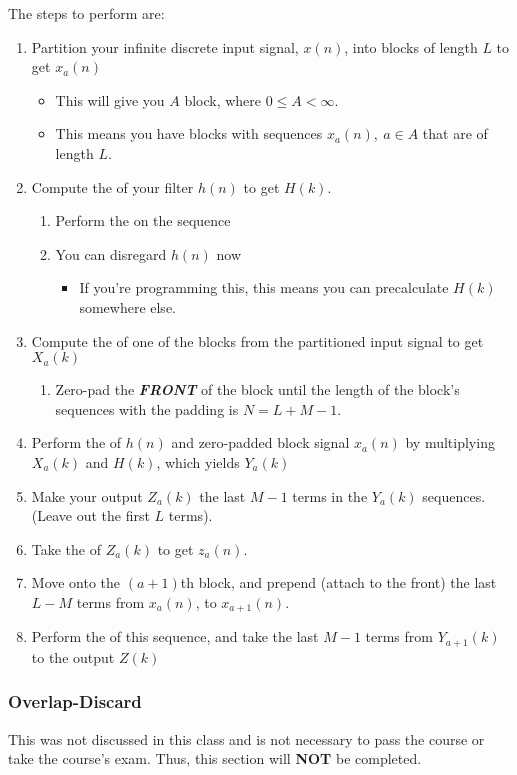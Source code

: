 The steps to perform  are:
\begin{enumerate}[noitemsep]
\item Partition your infinite discrete input signal, $x(n)$, into blocks of length $L$ to get $x_{a}(n)$
  \begin{itemize}[noitemsep]
  \item This will give you $A$ block, where $0 \leq A < \infty$.
  \item This means you have blocks with sequences $x_{a}(n), \: a \in A$ that are of length $L$.
  \end{itemize}
\item Compute the  of your filter $h(n)$ to get $H(k)$.
  \begin{enumerate}[noitemsep]
  \item Perform the  on the sequence
  \item You can disregard $h(n)$ now
    \begin{itemize}[noitemsep]
    \item If you're programming this, this means you can precalculate $H(k)$ somewhere else.
    \end{itemize}
  \end{enumerate}
\item Compute the  of one of the blocks from the partitioned input signal to get $X_{a}(k)$
  \begin{enumerate}[noitemsep]
  \item Zero-pad the \textbf{\emph{FRONT}} of the block until the length of the block's sequences with the padding is $N=L+M-1$.
  \end{enumerate}
\item Perform the  of $h(n)$ and zero-padded block signal $x_{a}(n)$ by multiplying $X_{a}(k)$ and $H(k)$, which yields $Y_{a}(k)$
\item Make your output $Z_{a}(k)$ the last $M-1$ terms in the $Y_{a}(k)$ sequences. (Leave out the first $L$ terms).
\item Take the  of $Z_{a}(k)$ to get $z_{a}(n)$.
\item Move onto the $(a+1)$th block, and prepend (attach to the front) the last $L-M$ terms from $x_{a}(n)$, to $x_{a+1}(n)$.
\item Perform the  of this sequence, and take the last $M-1$ terms from $Y_{a+1}(k)$ to the output $Z(k)$
\end{enumerate}

\subsubsection{Overlap-Discard}\label{subsubsec:DFT_Application-Overlap_Discard}
This was not discussed in this class and is not necessary to pass the course or take the course's exam.
Thus, this section will \textbf{NOT} be completed.

